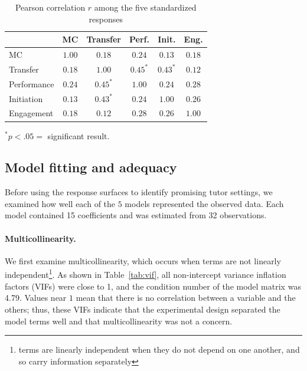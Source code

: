 \documentclass[12pt]{article}
\begin{document}
\begin{table}[htbp]
\centering
\caption{Pearson correlation $r$ among the five standardized responses}
\label{tab:corr}
\begin{threeparttable}
\begin{tabular}{lccccc}
\toprule
& MC & Transfer & Perf. & Init. & Eng. \\
\midrule
MC          & $1.00$ & $0.18$ & $0.24$ & $0.13$ & $0.18$ \\
Transfer    & $0.18$ & $1.00$ & $0.45^{*}$ & $0.43^{*}$ & $0.12$ \\
Performance & $0.24$ & $0.45^{*}$ & $1.00$ & $0.24$ & $0.28$ \\
Initiation  & $0.13$ & $0.43^{*}$ & $0.24$ & $1.00$ & $0.26$ \\
Engagement  & $0.18$ & $0.12$ & $0.28$ & $0.26$ & $1.00$ \\
\bottomrule
\end{tabular}
\begin{tablenotes}\footnotesize
\begin{centering}
\item $^{*}p<.05 =$ significant result.
\end{centering}
\end{tablenotes}
\end{threeparttable}
\end{table}

\subsection{Model fitting and adequacy}
\label{sec:model-adequacy}

Before using the response surfaces to identify promising tutor settings, we
examined how well each of the $5$ models represented the observed data.
Each model contained 15 coefficients and was estimated from 32 observations.

\paragraph{Multicollinearity.}
We first examine multicollinearity, which occurs when terms are not linearly independent\footnote{terms are linearly independent when they do not depend on one another, and so carry information separately}. As shown in Table~\ref{tab:vif}, all
non-intercept variance inflation factors (VIFs) were close to 1, and the
condition number of the model matrix was 4.79. Values near $1$ mean that there is no correlation between a variable and the others; thus, these VIFs indicate that
the experimental design separated the model terms well and that
multicollinearity was not a concern.
\end{document}
